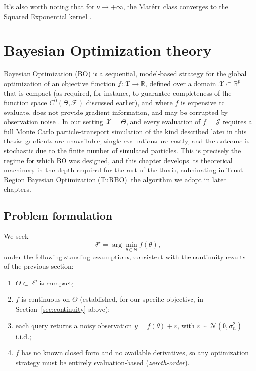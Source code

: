 \documentclass{article}
\begin{document}
	It's also worth noting that for $\nu \rightarrow +\infty$, the Matérn class converges to the Squared Exponential kernel \cite{rasmussen_2005}.
	
	
	\section{Bayesian Optimization theory}
	
	Bayesian Optimization (BO) is a sequential, model-based strategy for the global optimization of an objective function $f: \mathcal{X} \to \mathbb{R}$, defined over a domain $\mathcal{X} \subset \mathbb{R}^p$ that is compact (as required, for instance, to guarantee completeness of the function space $C^0(\Theta, \mathcal{F})$ discussed earlier), and where $f$ is expensive to evaluate, does not provide gradient information, and may be corrupted by observation noise \cite{frazier2018tutorialbayesianoptimization, garnett_bayesoptbook_2023}. In our setting $\mathcal{X} = \Theta$, and every evaluation of $f = \mathcal{J}$ requires a full Monte Carlo particle-transport simulation of the kind described later in this thesis: gradients are unavailable, single evaluations are costly, and the outcome is stochastic due to the finite number of simulated particles. This is precisely the regime for which BO was designed, and this chapter develops its theoretical machinery in the depth required for the rest of the thesis, culminating in Trust Region Bayesian Optimization (TuRBO), the algorithm we adopt in later chapters.
	
	\subsection{Problem formulation}
	
	We seek
	\begin{equation}
		\theta^\star = \arg\min_{\theta \in \Theta} f(\theta),
	\end{equation}
	under the following standing assumptions, consistent with the continuity results of the previous section:
	\begin{enumerate}
		\item $\Theta \subset \mathbb{R}^p$ is compact;
		\item $f$ is continuous on $\Theta$ (established, for our specific objective, in Section~\ref{sec:continuity} above);
		\item each query returns a noisy observation $y = f(\theta) + \varepsilon$, with $\varepsilon \sim \mathcal{N}(0, \sigma_n^2)$ i.i.d.;
		\item $f$ has no known closed form and no available derivatives, so any optimization strategy must be entirely evaluation-based (\textit{zeroth-order}).
	\end{enumerate}
	
\end{document}
